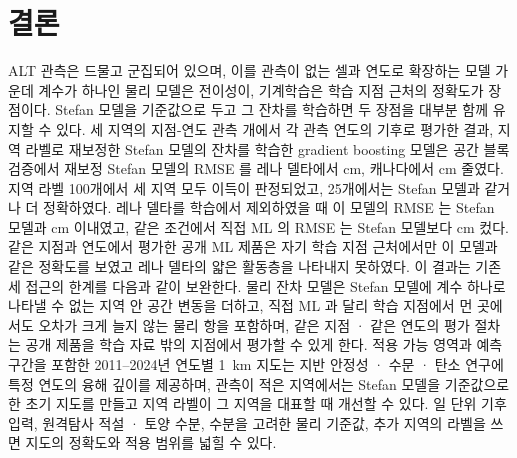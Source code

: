 \section{결론}\label{sec:conclusions}
ALT 관측은 드물고 군집되어 있으며, 이를 관측이 없는 셀과 연도로 확장하는 모델 가운데 계수가 하나인 물리 모델은 전이성이, 기계학습은 학습 지점 근처의 정확도가 장점이다. Stefan 모델을 기준값으로 두고 그 잔차를 학습하면 두 장점을 대부분 함께 유지할 수 있다. 세 지역의 지점-연도 관측 \nncyAll{}개에서 각 관측 연도의 기후로 평가한 결과, 지역 라벨로 재보정한 Stefan 모델의 잔차를 학습한 gradient boosting 모델은 공간 블록 검증에서 재보정 Stefan 모델의 RMSE 를 레나 델타에서 \ndrefLeblkRoabs{} cm, 캐나다에서 \ndrefCablkRoabs{} cm 줄였다. 지역 라벨 100개에서 세 지역 모두 이득이 판정되었고, 25개에서는 Stefan 모델과 같거나 더 정확하였다. 레나 델타를 학습에서 제외하였을 때 이 모델의 RMSE 는 Stefan 모델과 \ndrefLeregRoabs{} cm 이내였고, 같은 조건에서 직접 ML 의 RMSE 는 Stefan 모델보다 \ndrefLeregDzabs{} cm 컸다. 같은 지점과 연도에서 평가한 공개 ML 제품은 자기 학습 지점 근처에서만 이 모델과 같은 정확도를 보였고 레나 델타의 얇은 활동층을 나타내지 못하였다. 이 결과는 기존 세 접근의 한계를 다음과 같이 보완한다. 물리 잔차 모델은 Stefan 모델에 계수 하나로 나타낼 수 없는 지역 안 공간 변동을 더하고, 직접 ML 과 달리 학습 지점에서 먼 곳에서도 오차가 크게 늘지 않는 물리 항을 포함하며, 같은 지점 · 같은 연도의 평가 절차는 공개 제품을 학습 자료 밖의 지점에서 평가할 수 있게 한다. 적용 가능 영역과 예측 구간을 포함한 2011--2024년 연도별 1~km 지도는 지반 안정성 · 수문 · 탄소 연구에 특정 연도의 융해 깊이를 제공하며, 관측이 적은 지역에서는 Stefan 모델을 기준값으로 한 초기 지도를 만들고 지역 라벨이 그 지역을 대표할 때 개선할 수 있다. 일 단위 기후 입력, 원격탐사 적설 · 토양 수분, 수분을 고려한 물리 기준값, 추가 지역의 라벨을 쓰면 지도의 정확도와 적용 범위를 넓힐 수 있다.
